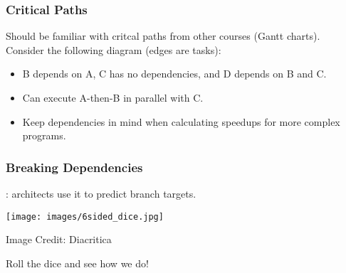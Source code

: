\begin{frame}
  \frametitle{Critical Paths}

  

  Should be familiar with critcal paths from other courses (Gantt charts).\\[1em]

  Consider the following diagram (edges are tasks):

\begin{center}
\end{center}

  \begin{itemize}
    \item B depends on A, C has no dependencies, and D depends on B and C.
    \item Can execute A-then-B in parallel with C.
    \item Keep dependencies in mind when calculating speedups for more
      complex programs.
  \end{itemize}
  
\end{frame}


\begin{frame}
  \frametitle{Breaking Dependencies}

  
  : architects use it to predict
      branch targets.
  
  \begin{center}
  	\texttt{[image: images/6sided\_dice.jpg]}
  \end{center}
  	\hfill Image Credit: Diacritica

Roll the dice and see how we do!

\end{frame}


